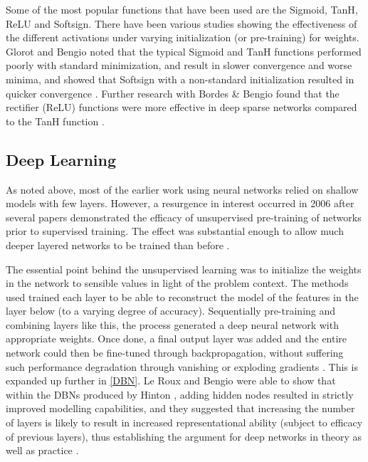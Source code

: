 \documentclass[a4paper,latin]{paper}
\begin{document}
Some of the most popular functions that have been used are the Sigmoid, TanH, ReLU and Softsign. There have 
been various studies showing the effectiveness of the different activations under varying initialization (or pre-training) 
for weights. Glorot and Bengio noted that the typical Sigmoid and TanH functions performed poorly with standard 
minimization, and result in slower convergence and worse minima, and showed that Softsign with a non-standard 
initialization resulted in quicker convergence \cite{Glorot}. Further research with Bordes \& Bengio found that the 
rectifier (ReLU) functions were  more effective in deep sparse networks compared to the TanH function \cite{Glorot2}.

\subsection{Deep Learning}

As noted above, most of the earlier work using neural networks relied on shallow models with few layers. 
However, a resurgence in interest occurred in 2006 after several papers demonstrated the efficacy of 
unsupervised pre-training of networks prior to supervised training. The effect was substantial enough to allow 
much deeper layered networks to be trained than before \cite{Bengio1, Hinton1}.
\hfill \break 
 
 The essential point behind the unsupervised learning was to initialize the weights in the network to sensible 
 values in light of the problem context. The methods used trained each layer to be able to reconstruct the model 
 of the features in the layer below (to a varying degree of accuracy). Sequentially pre-training and combining 
 layers like this, the process generated a deep neural network with appropriate weights. Once done, a final output 
 layer was added and the entire network could then be fine-tuned through backpropagation, without suffering 
 such performance degradation through vanishing or exploding gradients \cite{Hinton1, Ranzato1, Hinton2}. This is 
 expanded up further in \ref{DBN}. Le Roux and Bengio were able to show that within the DBNs produced by 
 Hinton \cite{Hinton1}, adding hidden nodes resulted in strictly improved modelling capabilities, and they suggested 
 that increasing the number of layers is likely to result in increased representational ability (subject to efficacy of 
 previous layers), thus establishing the argument for deep networks in theory as well as practice \cite{LeRoux}.
\hfill \break 
\end{document}
